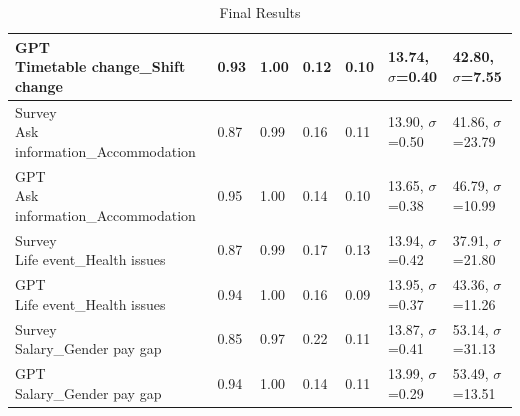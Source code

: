 \begin{table}[h]
{\begin{tabular}{|l|l|l|l|l|l|l|}
    \shortstack[l]{GPT\\Timetable change\_Shift change}                               & 0.93                          & 1.00                         & 0.12                              & 0.10                              & 13.74, $\sigma$=0.40               & 42.80, $\sigma$=7.55           \\ \hline
    \shortstack[l]{Survey\\Ask information\_Accommodation}                            & 0.87                          & 0.99                         & 0.16                              & 0.11                              & 13.90, $\sigma$=0.50               & 41.86, $\sigma$=23.79          \\ \hline
    \shortstack[l]{GPT\\Ask information\_Accommodation}                               & 0.95                          & 1.00                         & 0.14                              & 0.10                              & 13.65, $\sigma$=0.38               & 46.79, $\sigma$=10.99          \\ \hline
    \shortstack[l]{Survey\\Life event\_Health issues}                                 & 0.87                          & 0.99                         & 0.17                              & 0.13                              & 13.94, $\sigma$=0.42               & 37.91, $\sigma$=21.80          \\ \hline
    \shortstack[l]{GPT\\Life event\_Health issues}                                    & 0.94                          & 1.00                         & 0.16                              & 0.09                              & 13.95, $\sigma$=0.37               & 43.36, $\sigma$=11.26          \\ \hline
    \shortstack[l]{Survey\\Salary\_Gender pay gap}                                    & 0.85                          & 0.97                         & 0.22                              & 0.11                              & 13.87, $\sigma$=0.41               & 53.14, $\sigma$=31.13          \\ \hline
    \shortstack[l]{GPT\\Salary\_Gender pay gap}                                       & 0.94                          & 1.00                         & 0.14                              & 0.11                              & 13.99, $\sigma$=0.29               & 53.49, $\sigma$=13.51          \\ \hline
    \end{tabular}}
    \caption{Final Results}\label{table:final_results}
\end{table}

